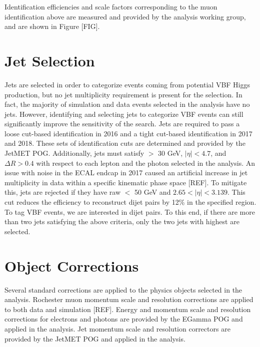Identification efficiencies and scale factors corresponding to the muon identification above are measured and provided by the 
\hzz analysis working group, and are shown in Figure [FIG].  

\section{Jet Selection}
Jets are selected in order to categorize events coming from potential VBF Higgs production, but no jet multiplicity requirement is present 
for the \hzg selection. In fact, the majority of simulation and data events selected in the analysis have no jets. However, identifying 
and selecting jets to categorize VBF events can still significantly improve the sensitivity of the search. Jets are required to pass 
a loose cut-based identification in 2016 and a tight cut-based identification in 2017 and 2018. These sets of identification cuts are
determined and provided by the JetMET POG. Additionally, jets must satisfy \pt $>$ 30 GeV, $|\eta| < 4.7$, and $\Delta R > 0.4$ with 
respect to each lepton and the photon selected in the analysis. An issue with noise in the ECAL endcap in 2017 caused an artificial 
increase in jet multiplicity in data within a specific kinematic phase space [REF]. To mitigate this, jets are rejected if they have 
raw \pt $<$ 50 GeV and $2.65 < |\eta| < 3.139$. This cut reduces the efficiency to reconstruct dijet pairs by 12\% in the specified 
region. To tag VBF events, we are interested in dijet pairs. To this end, if there are more than two jets satisfying the above criteria, 
only the two jets with highest \pt are selected. 

\section{Object Corrections}
Several standard corrections are applied to the physics objects selected in the analysis. Rochester muon momentum scale and resolution 
corrections are applied to both data and simulation [REF]. Energy and momentum scale and resolution corrections for electrons 
and photons are provided by the EGamma POG and applied in the analysis. Jet momentum scale and resolution correctors are provided by 
the JetMET POG and applied in the analysis. 

